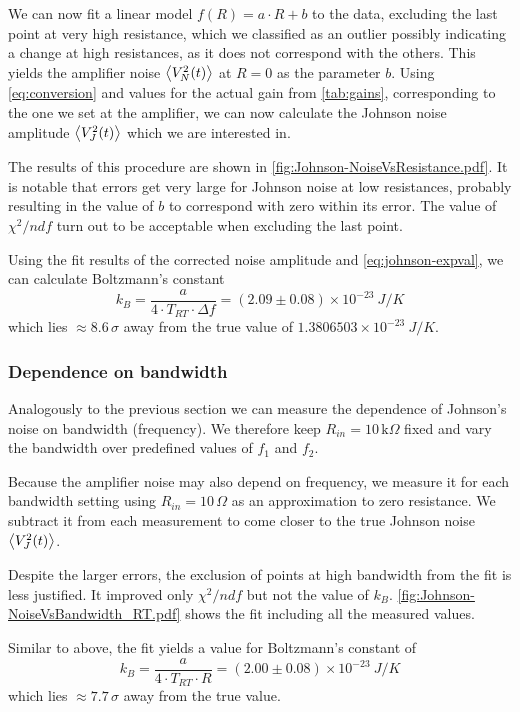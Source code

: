 We can now fit a linear model $f(R) = a \cdot R + b$ to the data, excluding the last point at very high resistance, which we classified as an outlier possibly indicating a change at high resistances, as it does not correspond with the others. This yields the amplifier noise $\expval{V_N^2(t)}$ at $R=0$ as the parameter $b$. Using \cref{eq:conversion} and values for the actual gain from \cref{tab:gains}, corresponding to the one we set at the amplifier, we can now calculate the Johnson noise amplitude $\expval{V_J^2(t)}$ which we are interested in.

The results of this procedure are shown in \cref{fig:Johnson-NoiseVsResistance.pdf}. It is notable that errors get very large for Johnson noise at low resistances, probably resulting in the value of $b$ to correspond with zero within its error. The value of $\chi^2/ndf$ turn out to be acceptable when excluding the last point.

Using the fit results of the corrected noise amplitude and \cref{eq:johnson-expval}, we can calculate Boltzmann's constant
\begin{equation}
	k_B = \frac{a}{4 \cdot T_{RT} \cdot \Delta f} = (2.09 \pm 0.08) \times 10^{-23} \SI{}{J/K}
\end{equation} 
which lies $\approx 8.6 \,\sigma$ away from the true value of $1.3806503 \times 10^{-23} \SI{}{J/K}$.

\subsubsection{Dependence on bandwidth}

Analogously to the previous section we can measure the dependence of Johnson's noise on bandwidth (frequency). We therefore keep $R_{in} = 10 \,\mathrm{k}\Omega$ fixed and vary the bandwidth over predefined values of $f_1$ and $f_2$. 

Because the amplifier noise may also depend on frequency, we measure it for each bandwidth setting using $R_{in} = 10 \,\Omega$ as an approximation to zero resistance. We subtract it from each measurement to come closer to the true Johnson noise $\expval{V_J^2(t)}$.

Despite the larger errors, the exclusion of points at high bandwidth from the fit is less justified. It improved only $\chi^2/ndf$ but not the value of $k_B$. \cref{fig:Johnson-NoiseVsBandwidth_RT.pdf} shows the fit including all the measured values.


Similar to above, the fit yields a value for Boltzmann's constant of
\begin{equation}
k_B = \frac{a}{4 \cdot T_{RT} \cdot R} = (2.00 \pm 0.08) \times 10^{-23} \SI{}{J/K}
\end{equation}
which lies $\approx 7.7 \,\sigma$ away from the true value. 


